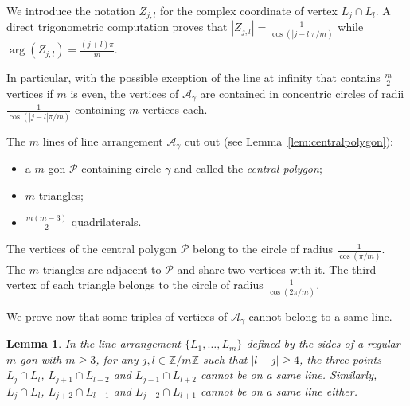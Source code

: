 \documentclass[a4paper,11pt,reqno]{amsart}
\newtheorem{lem}[thm]{Lemma}
\theoremstyle{definition}
\theoremstyle{remark}
\theoremstyle{definition}
\theoremstyle{definition}
\theoremstyle{definition}
\numberwithin{equation}{section}
\begin{document}
We introduce the notation $Z_{j,l}$ for the complex coordinate of vertex $L_{j} \cap L_{l}$. A direct trigonometric computation proves that $|Z_{j,l}|=\frac{1}{\cos(|j-l|\pi/m)}$ while $\arg(Z_{j,l})=\frac{(j+l)\pi}{m}$.
\par
In particular, with the possible exception of the line at infinity that contains $\frac{m}{2}$ vertices if $m$ is even, the vertices of $\mathcal{A}_{\gamma}$ are contained in concentric circles of radii $\frac{1}{\cos(|j-l|\pi/m)}$ containing $m$ vertices each. 
\par
The $m$ lines of line arrangement $\mathcal{A}_{\gamma}$ cut out (see Lemma~\ref{lem:centralpolygon}): 
\begin{itemize}
\item a $m$-gon $\mathcal{P}$ containing circle $\gamma$ and called the \textit{central polygon};
\item $m$ triangles;
\item $\frac{m(m-3)}{2}$ quadrilaterals.
\end{itemize}
The vertices of the central polygon $\mathcal{P}$ belong to the circle of radius $\frac{1}{\cos(\pi/m)}$. The $m$ triangles are adjacent to $\mathcal{P}$ and share two vertices with it. The third vertex of each triangle belongs to the circle of radius $\frac{1}{\cos(2\pi/m)}$.
\par
We prove now that some triples of vertices of $\mathcal{A}_{\gamma}$ cannot belong to a same line.

\begin{lem}\label{lem:alignement}
In the line arrangement $\lbrace{ L_{1},\dots, L_{m} \rbrace}$ defined by the sides of a regular $m$-gon with $m \geq 3$, for any $j,l \in \mathbb{Z}/m\mathbb{Z}$ such that $|l-j| \geq 4$, the three points $L_{j} \cap L_{l}$, $L_{j+1} \cap L_{l-2}$ and $L_{j-1} \cap L_{l+2}$ cannot be on a same line. Similarly, $L_{j} \cap L_{l}$, $L_{j+2} \cap L_{l-1}$ and $L_{j-2} \cap L_{l+1}$ cannot be on a same line either.
\end{lem}
\end{document}
